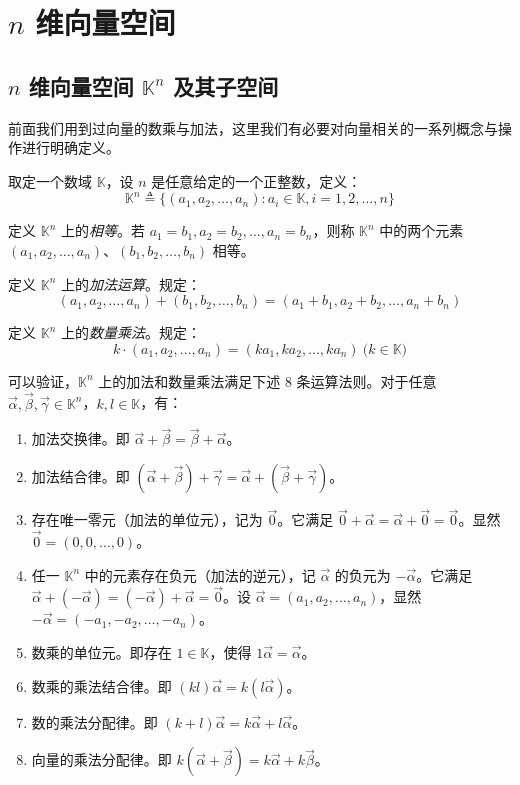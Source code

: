 
\chapter{$n$ 维向量空间}

\section{$n$ 维向量空间 $\mathbb K^n$ 及其子空间}

前面我们用到过向量的数乘与加法，这里我们有必要对向量相关的一系列概念与操作进行明确定义。

\bigskip

取定一个数域 $\mathbb K$，设 $n$ 是任意给定的一个正整数，定义：
$$
	\mathbb K^n \triangleq \{ (a_1, a_2, \ldots, a_n): a_i \in \mathbb K, i = 1, 2, \ldots, n \}
$$

定义 $\mathbb K^n$ 上的\emph{相等}。若 $a_1 = b_1, a_2 = b_2, \ldots, a_n = b_n$，则称 $\mathbb K^n$ 中的两个元素 $(a_1, a_2, \ldots, a_n)$、$(b_1, b_2, \ldots, b_n)$ 相等。

定义 $\mathbb K^n$ 上的\emph{加法运算}。规定：
$$
(a_1, a_2, \ldots, a_n) + (b_1, b_2, \ldots, b_n) = (a_1 + b_1, a_2 + b_2, \ldots, a_n + b_n)
$$

定义 $\mathbb K^n$ 上的\emph{数量乘法}。规定：
$$
k \cdot (a_1, a_2, \ldots, a_n) = (k a_1, k a_2, \ldots, k a_n) \pod{k \in \mathbb K}
$$

可以验证，$\mathbb K^n$ 上的加法和数量乘法满足下述 $8$ 条运算法则。对于任意 $\vec \alpha, \vec \beta, \vec \gamma \in \mathbb K^n$，$k, l \in \mathbb K$，有：
\begin{enumerate}
	\item 加法交换律。即 $\vec \alpha + \vec \beta = \vec \beta + \vec \alpha$。
	\item 加法结合律。即 $(\vec \alpha + \vec \beta) + \vec \gamma = \vec \alpha + (\vec \beta + \vec \gamma)$。
	\item 存在唯一零元（加法的单位元），记为 $\vec 0$。它满足 $\vec 0 + \vec \alpha = \vec \alpha + \vec 0 = \vec 0$。显然 $\vec 0 = (0, 0, \ldots, 0)$。
	\item 任一 $\mathbb K^n$ 中的元素存在负元（加法的逆元），记 $\vec \alpha$ 的负元为 $-\vec \alpha$。它满足 $\vec \alpha + (-\vec \alpha) = (-\vec \alpha) + \vec \alpha = \vec 0$。设 $\vec \alpha = (a_1, a_2, \ldots, a_n)$，显然 $-\vec \alpha = (-a_1, -a_2, \ldots, -a_n)$。
	\item 数乘的单位元。即存在 $1 \in \mathbb K$，使得 $1 \vec \alpha = \vec \alpha$。
	\item 数乘的乘法结合律。即 $(kl) \vec \alpha = k(l \vec \alpha)$。
	\item 数的乘法分配律。即 $(k + l) \vec \alpha = k \vec \alpha + l \vec \alpha$。
	\item 向量的乘法分配律。即 $k(\vec \alpha + \vec \beta) = k \vec \alpha + k \vec \beta$。
\end{enumerate}

